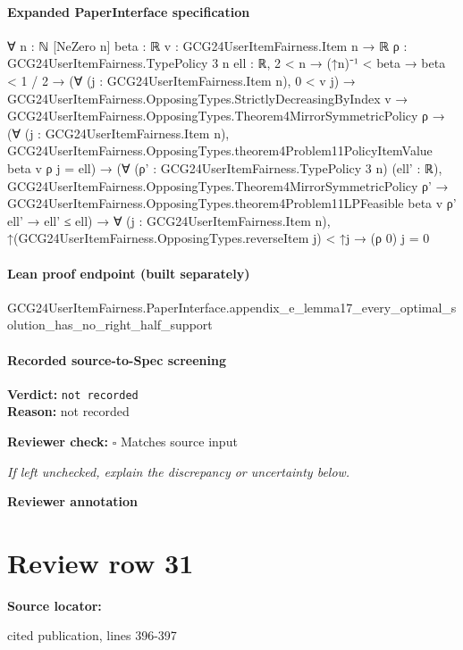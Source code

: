 \documentclass[10pt]{article}
\newcommand{\reviewerbox}{%
  \par\noindent\fbox{\parbox{0.96\linewidth}{\rule{0pt}{0.38in}}}\par
}
\newcommand{\reviewmatch}[1]{%
  \par\noindent\textbf{Reviewer check:} $\square$\; #1\par
  \noindent\emph{If left unchecked, explain the discrepancy or uncertainty below.}\par
}
\begin{document}
\paragraph{Expanded PaperInterface specification}
\begin{ReviewVerbatim}
∀ {n : ℕ} [NeZero n] {beta : ℝ} {v : GCG24UserItemFairness.Item n → ℝ} {ρ : GCG24UserItemFairness.TypePolicy 3 n}
  {ell : ℝ},
  2 < n →
    (↑n)⁻¹ < beta →
      beta < 1 / 2 →
        (∀ (j : GCG24UserItemFairness.Item n), 0 < v j) →
          GCG24UserItemFairness.OpposingTypes.StrictlyDecreasingByIndex v →
            GCG24UserItemFairness.OpposingTypes.Theorem4MirrorSymmetricPolicy ρ →
              (∀ (j : GCG24UserItemFairness.Item n),
                  GCG24UserItemFairness.OpposingTypes.theorem4Problem11PolicyItemValue beta v ρ j = ell) →
                (∀ (ρ' : GCG24UserItemFairness.TypePolicy 3 n) (ell' : ℝ),
                    GCG24UserItemFairness.OpposingTypes.Theorem4MirrorSymmetricPolicy ρ' →
                      GCG24UserItemFairness.OpposingTypes.theorem4Problem11LPFeasible beta v ρ' ell' → ell' ≤ ell) →
                  ∀ (j : GCG24UserItemFairness.Item n),
                    ↑(GCG24UserItemFairness.OpposingTypes.reverseItem j) < ↑j → (ρ 0) j = 0
\end{ReviewVerbatim}

\paragraph{Lean proof endpoint (built separately)}\begin{ReviewVerbatim}
GCG24UserItemFairness.PaperInterface.appendix_e_lemma17_every_optimal_solution_has_no_right_half_support
\end{ReviewVerbatim}

\paragraph{Recorded source-to-Spec screening}
\textbf{Verdict:} \texttt{not recorded}
\\
\textbf{Reason:} not recorded
\reviewmatch{Matches source input}
\noindent\textbf{Reviewer annotation}\par
\reviewerbox
\clearpage
\hypertarget{source-claim-b8bc7fe7622f9901}{}
\section*{Review row 31}
\textbf{Source locator:} {\footnotesize\raggedright cited publication, lines 396-\allowbreak{}397\par}
\end{document}
